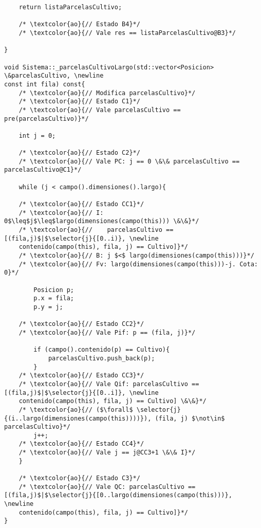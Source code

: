 \begin{lstlisting}
    return listaParcelasCultivo;
    
    /* \textcolor{ao}{// Estado B4}*/	    
    /* \textcolor{ao}{// Vale res == listaParcelasCultivo@B3}*/    
    
}

void Sistema::_parcelasCultivoLargo(std::vector<Posicion> \&parcelasCultivo, \newline  
const int fila) const{
	/* \textcolor{ao}{// Modifica parcelasCultivo}*/	        
    /* \textcolor{ao}{// Estado C1}*/	    
    /* \textcolor{ao}{// Vale parcelasCultivo == pre(parcelasCultivo)}*/      
    
    int j = 0;
	
	/* \textcolor{ao}{// Estado C2}*/	    
    /* \textcolor{ao}{// Vale PC: j == 0 \&\& parcelasCultivo == parcelasCultivo@C1}*/      
    
    while (j < campo().dimensiones().largo){

	/* \textcolor{ao}{// Estado CC1}*/	    
    /* \textcolor{ao}{// I: 0$\leq$j$\leq$largo(dimensiones(campo(this))) \&\&}*/        
    /* \textcolor{ao}{//    parcelasCultivo == [(fila,j)$|$\selector{j}{[0..i)}, \newline
    contenido(campo(this), fila, j) == Cultivo]}*/ 
    /* \textcolor{ao}{// B: j $<$ largo(dimensiones(campo(this)))}*/   
	/* \textcolor{ao}{// Fv: largo(dimensiones(campo(this)))-j. Cota: 0}*/
	     
        Posicion p;
        p.x = fila;
        p.y = j;

    /* \textcolor{ao}{// Estado CC2}*/   
	/* \textcolor{ao}{// Vale Pif: p == (fila, j)}*/
        
        if (campo().contenido(p) == Cultivo){
            parcelasCultivo.push_back(p);
        }
	/* \textcolor{ao}{// Estado CC3}*/
	/* \textcolor{ao}{// Vale Qif: parcelasCultivo == [(fila,j)$|$\selector{j}{[0..i]}, \newline
    contenido(campo(this), fila, j) == Cultivo] \&\&}*/
	/* \textcolor{ao}{// ($\forall$ \selector{j}{(i..largo(dimensiones(campo(this))))}), (fila, j) $\not\in$ parcelasCultivo}*/
        j++;
    /* \textcolor{ao}{// Estado CC4}*/   
	/* \textcolor{ao}{// Vale j == j@CC3+1 \&\& I}*/
    }
	
	/* \textcolor{ao}{// Estado C3}*/	    
    /* \textcolor{ao}{// Vale QC: parcelasCultivo == [(fila,j)$|$\selector{j}{[0..largo(dimensiones(campo(this)))}, \newline
    contenido(campo(this), fila, j) == Cultivo]}*/      
}


\end{lstlisting}
